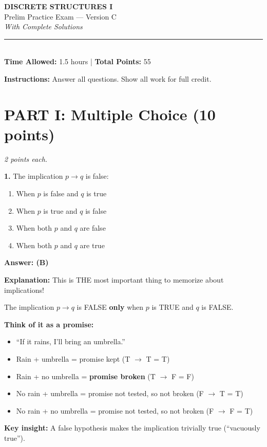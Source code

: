 \documentclass[11pt,a4paper]{article}
\begin{document}
\begin{center}
{\LARGE\textbf{DISCRETE STRUCTURES I}}\\[5pt]
{\Large Prelim Practice Exam --- Version C}\\[5pt]
{\large\textit{With Complete Solutions}}\\[10pt]
\rule{0.8\textwidth}{0.5pt}\\[5pt]
\textbf{Time Allowed:} 1.5 hours \quad | \quad \textbf{Total Points:} 55
\end{center}

\vspace{10pt}

\noindent\textbf{Instructions:} Answer all questions. Show all work for full credit.

\vspace{15pt}

\section*{PART I: Multiple Choice (10 points)}
\textit{2 points each.}

\vspace{8pt}

\textbf{1.} The implication $p \to q$ is false:

\begin{enumerate}[label=(\Alph*),noitemsep]
    \item When $p$ is false and $q$ is true
    \item When $p$ is true and $q$ is false
    \item When both $p$ and $q$ are false
    \item When both $p$ and $q$ are true
\end{enumerate}

\begin{solnbox}
\textbf{Answer: (B)}

\textbf{Explanation:} This is THE most important thing to memorize about implications!

The implication $p \to q$ is FALSE \textbf{only} when $p$ is TRUE and $q$ is FALSE.

\textbf{Think of it as a promise:}
\begin{itemize}[noitemsep]
    \item ``If it rains, I'll bring an umbrella.''
    \item Rain + umbrella = promise kept (T $\to$ T = T)
    \item Rain + no umbrella = \textbf{promise broken} (T $\to$ F = F)
    \item No rain + umbrella = promise not tested, so not broken (F $\to$ T = T)
    \item No rain + no umbrella = promise not tested, so not broken (F $\to$ F = T)
\end{itemize}

\textbf{Key insight:} A false hypothesis makes the implication trivially true (``vacuously true'').
\end{solnbox}
\end{document}
